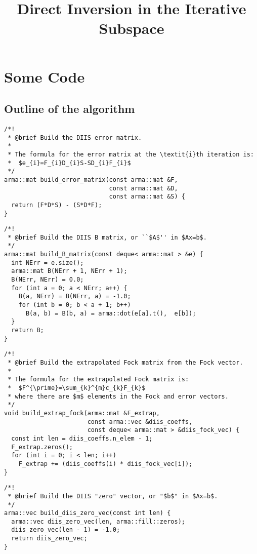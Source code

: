 \documentclass{article}
\begin{document}
\title{Direct Inversion in the Iterative Subspace}

\section{Some Code}

\subsection{Outline of the algorithm}

\begin{verbatim}
/*!
 * @brief Build the DIIS error matrix.
 *
 * The formula for the error matrix at the \textit{i}th iteration is:
 *  $e_{i}=F_{i}D_{i}S-SD_{i}F_{i}$
 */
arma::mat build_error_matrix(const arma::mat &F,
                             const arma::mat &D,
                             const arma::mat &S) {
  return (F*D*S) - (S*D*F);
}
\end{verbatim}

\begin{verbatim}
/*!
 * @brief Build the DIIS B matrix, or ``$A$'' in $Ax=b$.
 */
arma::mat build_B_matrix(const deque< arma::mat > &e) {
  int NErr = e.size();
  arma::mat B(NErr + 1, NErr + 1);
  B(NErr, NErr) = 0.0;
  for (int a = 0; a < NErr; a++) {
    B(a, NErr) = B(NErr, a) = -1.0;
    for (int b = 0; b < a + 1; b++)
      B(a, b) = B(b, a) = arma::dot(e[a].t(),  e[b]);
  }
  return B;
}
\end{verbatim}

\begin{verbatim}
/*!
 * @brief Build the extrapolated Fock matrix from the Fock vector.
 *
 * The formula for the extrapolated Fock matrix is:
 *  $F^{\prime}=\sum_{k}^{m}c_{k}F_{k}$
 * where there are $m$ elements in the Fock and error vectors.
 */
void build_extrap_fock(arma::mat &F_extrap,
                       const arma::vec &diis_coeffs,
                       const deque< arma::mat > &diis_fock_vec) {
  const int len = diis_coeffs.n_elem - 1;
  F_extrap.zeros();
  for (int i = 0; i < len; i++)
    F_extrap += (diis_coeffs(i) * diis_fock_vec[i]);
}
\end{verbatim}

\begin{verbatim}
/*!
 * @brief Build the DIIS "zero" vector, or "$b$" in $Ax=b$.
 */
arma::vec build_diis_zero_vec(const int len) {
  arma::vec diis_zero_vec(len, arma::fill::zeros);
  diis_zero_vec(len - 1) = -1.0;
  return diis_zero_vec;
}
\end{verbatim}
\end{document}
